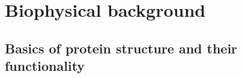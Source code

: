 \chapter{Biophysical background}\label{chap:biophys-back}

\section{Basics of protein structure and their functionality}\label{sec:protein-struct-fun}
